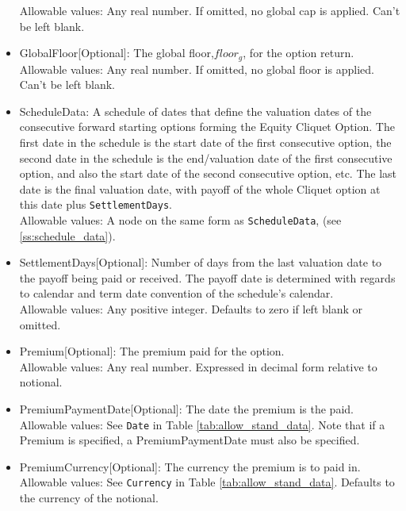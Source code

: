 \begin{itemize}
	Allowable values: Any real number. If omitted, no global cap is applied.  Can't be left blank.
	\item GlobalFloor[Optional]: The global floor,$floor_{g}$, for the option return. \\
	Allowable values: Any real number. If omitted, no global floor is applied.  Can't be left blank.
	\item ScheduleData: A schedule of dates that define the valuation dates of the consecutive forward starting options forming the Equity Cliquet Option. The first date in the schedule is the start date of the first consecutive option, the second date in the schedule is the end/valuation date of the first consecutive option, and also the start date of the second consecutive option, etc.  The last date is the final valuation date, with payoff of the whole Cliquet option at this date plus \lstinline!SettlementDays!. \\
	 Allowable values: A node on the same form as \lstinline!ScheduleData!, (see \ref{ss:schedule_data}). 
	\item SettlementDays[Optional]: Number of days from the last valuation date to the payoff being paid or received. The payoff date is determined with regards to calendar and
		   term date convention of the schedule's calendar. \\
	Allowable values: Any positive integer. Defaults to zero if left blank or omitted.
	\item Premium[Optional]: The premium paid for the option. \\
	Allowable values: Any real number. Expressed in decimal form relative to notional.
	\item PremiumPaymentDate[Optional]: The date the premium is the paid. \\
	Allowable values: See \lstinline!Date! in Table \ref{tab:allow_stand_data}. Note that if a Premium is specified, a PremiumPaymentDate must also be specified. 
	\item PremiumCurrency[Optional]: The currency the premium is to paid in. \\
	Allowable values: See \lstinline!Currency! in Table \ref{tab:allow_stand_data}. Defaults to the currency of the notional. 
\end{itemize}